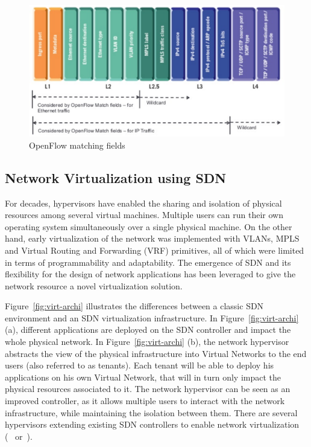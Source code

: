 \begin{figure}[h]
    \centering
    \includegraphics[scale=0.7]{figures/openflow-matchfields.pdf}
    \caption{OpenFlow matching fields~\cite{openflow-matchfields}}
    \label{fig:matching-fields}
\end{figure}

\subsection{Network Virtualization using SDN}
\label{def:netvirt}

For decades, hypervisors have enabled the sharing and isolation of physical resources among several virtual machines.
Multiple users can run their own operating system simultaneously over a single physical machine.
On the other hand, early virtualization of the network was implemented with VLANs, MPLS and Virtual Routing and Forwarding (VRF) primitives, all of which were limited in terms of programmability and adaptability. The emergence of SDN and its flexibility for the design of network applications has been leveraged to give the network resource a novel virtualization solution.

Figure~\ref{fig:virt-archi} illustrates the differences between a classic SDN environment and an SDN virtualization infrastructure. In Figure~\ref{fig:virt-archi} (a), different applications are deployed on the SDN controller and impact the whole physical network.
In Figure~\ref{fig:virt-archi} (b), the network hypervisor abstracts the view of the physical infrastructure into Virtual Networks to the end users (also referred to as tenants).
Each tenant will be able to deploy his applications on his own Virtual Network, that will in turn only impact the physical resources associated to it.
The network hypervisor can be seen as an improved controller, as it allows multiple users to interact with the network infrastructure, while maintaining the isolation between them.
There are several hypervisors extending existing SDN controllers to enable network virtualization (\eg~\cite{FlowN-Drutskoy2012} or~\cite{ONVisor-Han2018}).


